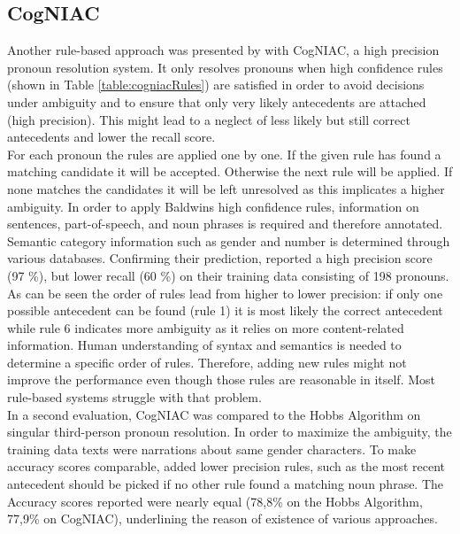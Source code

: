 \subsection{CogNIAC}
Another rule-based approach was presented by \citep{baldwin1997cogniac} with CogNIAC, a high precision pronoun resolution system. It only resolves pronouns when high confidence rules (shown in Table \ref{table:cogniacRules}) are satisfied in order to avoid decisions under ambiguity and to ensure that only very likely antecedents are attached (high precision). This might lead to a neglect of less likely but still correct antecedents and lower the recall score. 
\\
For each pronoun the rules are applied one by one. If the given rule has found a matching candidate it will be accepted. Otherwise the next rule will be applied. If none matches the candidates it will be left unresolved as this implicates a higher ambiguity. In order to apply Baldwins high confidence rules, information on sentences, part-of-speech, and noun phrases is required and therefore annotated. Semantic category information such as gender and number is determined through various databases. Confirming their prediction, \citep{baldwin1997cogniac} reported a high precision score (97 \%), but lower recall (60 \%) on their training data consisting of 198 pronouns.\\
As can be seen the order of rules lead from higher to lower precision: if only one possible antecedent can be found (rule 1) it is most likely the correct antecedent while rule 6 indicates more ambiguity as it relies on more content-related information. Human understanding of syntax and semantics is needed to determine a specific order of rules. Therefore, adding new rules might not improve the performance even though those rules are reasonable in itself. Most rule-based systems struggle with that problem.\\
In a second evaluation, CogNIAC was compared to the Hobbs Algorithm \citep{baldwin1997cogniac,hobbs1978resolving} on singular third-person pronoun resolution. In order to maximize the ambiguity, the training data texts were narrations about same gender characters. To make accuracy scores comparable, \cite{baldwin1997cogniac} added lower precision rules, such as the most recent antecedent should be picked if no other rule found a matching noun phrase. The Accuracy scores reported were nearly equal (78,8\% on the Hobbs Algorithm, 77,9\% on CogNIAC), underlining the reason of existence of various approaches.
